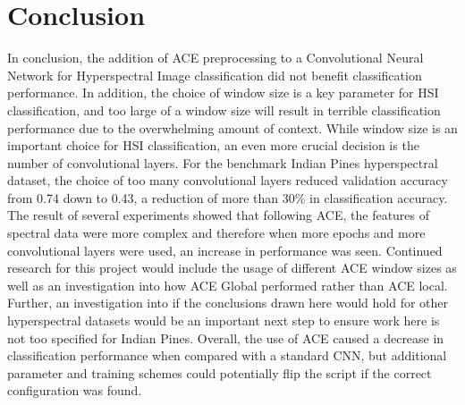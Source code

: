 \documentclass[12pt]{article}
\begin{document}
\section{Conclusion}\label{sec:conclusion}
In conclusion, the addition of ACE preprocessing to a Convolutional Neural Network for Hyperspectral Image classification did not benefit classification performance. 
%
In addition, the choice of window size is a key parameter for HSI classification, and too large of a window size will result in terrible classification performance due to the overwhelming amount of context. 
%
While window size is an important choice for HSI classification, an even more crucial decision is the number of convolutional layers.
%
For the benchmark Indian Pines hyperspectral dataset, the choice of too many convolutional layers reduced validation accuracy from 0.74 down to 0.43, a reduction of more than 30\% in classification accuracy.
%
The result of several experiments showed that following ACE, the features of spectral data were more complex and therefore when more epochs and more convolutional layers were used, an increase in performance was seen.
%
Continued research for this project would include the usage of different ACE window sizes as well as an investigation into how ACE Global performed rather than ACE local.
%
Further, an investigation into if the conclusions drawn here would hold for other hyperspectral datasets would be an important next step to ensure work here is not too specified for Indian Pines.
%
Overall, the use of ACE caused a decrease in classification performance when compared with a standard CNN, but additional parameter and training schemes could potentially flip the script if the correct configuration was found.



 

\end{document}
